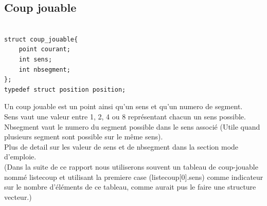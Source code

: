 \documentclass[11pt]{article}
\begin{document}
\subsection{Coup jouable}
\begin{lstlisting}

struct coup_jouable{
	point courant;
	int sens;
	int nbsegment;
};
typedef struct position position;

\end{lstlisting}
Un coup jouable est un point ainsi qu'un sens et qu'un numero de segment.\\
Sens vaut une valeur entre 1, 2, 4 ou 8 représentant chacun un sens possible.\\
Nbsegment vaut le numero du segment possible dans le sens associé (Utile quand plusieurs segment sont possible sur le même sens).\\
Plus de detail sur les valeur de sens et de nbsegment dans la section mode d'emploie.\\
(Dans la suite de ce rapport nous utiliserons souvent un tableau de coup-jouable nommé listecoup et utilisant la premiere case (listecoup[0].sens) comme indicateur sur le nombre d'éléments de ce tableau, comme aurait pus le faire une structure vecteur.)\\
\end{document}
